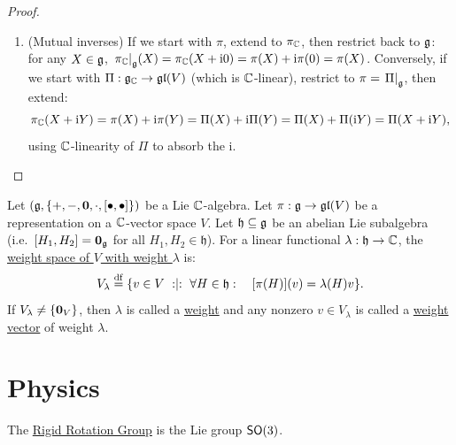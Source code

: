 \documentclass[11pt,reqno]{amsart}
\newcommand{\ii}{\mathrm{i}}
\begin{document}
\begin{proof}
\begin{enumerate}
\item (Mutual inverses)
If we start with $\pi$, extend to $\pi_{\mathbb{C}}$, then restrict back to $\mathfrak{g}$:
for any $X\in\mathfrak{g}$,
$\eval{\pi_\C}_{\g}(X)=\pi_\C(X+\ii0)=\pi(X)+\ii\pi(0)=\pi(X)$.
Conversely, if we start with $\Pi:\mathfrak{g}_{\mathbb{C}}\to\mathfrak{gl}(V)$ (which is $\mathbb{C}$-linear),
restrict to $\pi=\eval{\Pi}_{\g}$, then extend:
\[
\pi_\C(X+\ii Y)=\pi(X)+\ii\pi(Y)=\Pi(X)+\ii\Pi(Y)=\Pi(X)+\Pi(\ii Y)=\Pi(X+\ii Y),
\]
using $\mathbb{C}$-linearity of $\Pi$ to absorb the $\ii$.

\end{enumerate}
\end{proof}


\begin{Def}\label{def:weight-space}
Let $\Br{\g,\set{+,-,\bm0,\cdot,\SqBr{\bullet,\bullet}}}$ be a Lie $\mathbb{C}$-algebra.
Let $\pi:\mathfrak{g}\to\mathfrak{gl}(V)$ be a representation on a $\mathbb{C}$-vector space $V$.
Let $\mathfrak{h}\subseteq\mathfrak{g}$ be an abelian Lie subalgebra
(i.e.\ $\SqBr{H_1,H_2}=\bm0_\g$ for all $H_1,H_2\in\mathfrak{h}$).
For a linear functional $\lambda:\mathfrak{h}\to\mathbb{C}$, the
\ul{weight space of $V$ with weight $\lambda$} is:
\[
V_\lambda\df\set{v\in V\st\forall H\in\mathfrak{h}:\quad
\FUNC{\pi(H)}{v}=\lambda(H)v}.
\]
If $V_\lambda\neq\set{\bm0_V}$, then $\lambda$ is called a \ul{weight}
and any nonzero $v\in V_\lambda$ is called a \ul{weight vector} of weight $\lambda$.
\end{Def}


\section{Physics}

\begin{Def}
The \ul{Rigid Rotation Group} is the Lie group $\operatorname{\mathsf{SO}}(3)$.
\end{Def}
\end{document}
